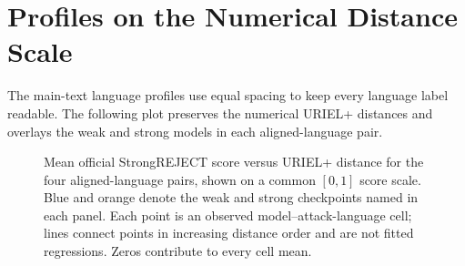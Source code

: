 \section{Profiles on the Numerical Distance Scale}
The main-text language profiles use equal spacing to keep every language label readable. The following plot preserves the numerical URIEL+ distances and overlays the weak and strong models in each aligned-language pair.

\begin{figure}[p]\centering
\resizebox{\linewidth}{!}{}
\caption{Mean official StrongREJECT score versus URIEL+ distance for the four aligned-language pairs, shown on a common $[0,1]$ score scale. Blue and orange denote the weak and strong checkpoints named in each panel. Each point is an observed model--attack-language cell; lines connect points in increasing distance order and are not fitted regressions. Zeros contribute to every cell mean.}\label{fig:graded-distance}
\end{figure}
